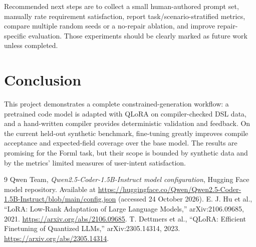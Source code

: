 \documentclass[11pt,a4paper]{article}
\begin{document}
Recommended next steps are to collect a small human-authored prompt set, manually rate requirement satisfaction, report task/scenario-stratified metrics, compare multiple random seeds or a no-repair ablation, and improve repair-specific evaluation. Those experiments should be clearly marked as future work unless completed.

\section{Conclusion}
This project demonstrates a complete constrained-generation workflow: a pretrained code model is adapted with QLoRA on compiler-checked DSL data, and a hand-written compiler provides deterministic validation and feedback. On the current held-out synthetic benchmark, fine-tuning greatly improves compile acceptance and expected-field coverage over the base model. The results are promising for the Forml task, but their scope is bounded by synthetic data and by the metrics' limited measures of user-intent satisfaction.

\begin{thebibliography}{9}
Qwen Team, \emph{Qwen2.5-Coder-1.5B-Instruct model configuration}, Hugging Face model repository. Available at \url{https://huggingface.co/Qwen/Qwen2.5-Coder-1.5B-Instruct/blob/main/config.json} (accessed 24 October 2026).
E. J. Hu et al., ``LoRA: Low-Rank Adaptation of Large Language Models,'' arXiv:2106.09685, 2021. \url{https://arxiv.org/abs/2106.09685}.
T. Dettmers et al., ``QLoRA: Efficient Finetuning of Quantized LLMs,'' arXiv:2305.14314, 2023. \url{https://arxiv.org/abs/2305.14314}.
\end{thebibliography}
\end{document}
